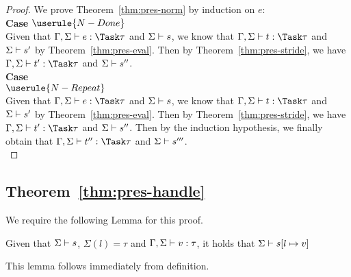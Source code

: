 \begin{proof}
  We prove Theorem~\ref{thm:pres-norm} by induction on $e$:\\

  \noindent\textbf{Case} $\userule{N-Done}$ \\
  \indent Given that
  $\Gamma,\Sigma\infers e:\Task\tau$ and $\Sigma\vdash s$, we know that
  $\Gamma,\Sigma\infers t:\Task\tau$ and $\Sigma\vdash s'$ by
  Theorem~\ref{thm:pres-eval}. Then by Theorem~\ref{thm:pres-stride}, we have
  $\Gamma,\Sigma\infers t':\Task\tau$ and $\Sigma\vdash s''$.\\

  \noindent\textbf{Case}\\
  $\userule{N-Repeat}$ \\
  \indent Given that
  $\Gamma,\Sigma\infers e:\Task\tau$ and $\Sigma\vdash s$, we know that
  $\Gamma,\Sigma\infers t:\Task\tau$ and $\Sigma\vdash s'$ by
  Theorem~\ref{thm:pres-eval}. Then by Theorem~\ref{thm:pres-stride}, we have
  $\Gamma,\Sigma\infers t':\Task\tau$ and $\Sigma\vdash s''$. Then by the
  induction hypothesis, we finally obtain that
  $\Gamma,\Sigma\infers t'':\Task\tau$ and $\Sigma\vdash s'''$.\\

\end{proof}



\subsection{Theorem~\ref{thm:pres-handle}}

We require the following Lemma for this proof.

\begin{lemma}
  Given that $\Sigma\vdash s$, $\Sigma(l)=\tau$ and $\Gamma,\Sigma\vdash v:\tau$, it holds that $\Sigma\vdash s[l\mapsto v]$
  \label{lemmasigmaconsistent}
\end{lemma}
This lemma follows immediately from definition.


